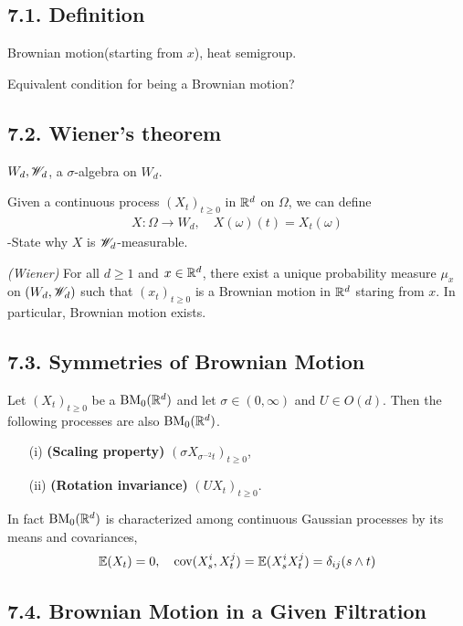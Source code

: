 \documentclass[10pt,a4paper]{report}
\begin{document}
\subsection*{7.1. Definition}

 Brownian motion(starting from $x$), heat semigroup.
\s

Equivalent condition for being a Brownian motion?

\subsection*{7.2. Wiener's theorem}

$W_d, \mathscr{W}_d$, a $\sigma$-algebra on $W_d$.
\s

Given a continuous process $(X_t)_{t\geq 0}$ in $\mathbb{R}^d$ on $\Omega$, we can define 
\begin{align*}
X : \Omega \rightarrow W_d, \quad X(\omega)(t) = X_t(\omega)
\end{align*}
-State why $X$ is $\mathscr{W}_d$-measurable.
\s

\emph{(Wiener)} For all $d\geq 1$ and $x\in \mathbb{R}^d$, there exist a unique probability measure $\mu_x$ on $(W_d, \mathscr{W}_d)$ such that $(x_t)_{t\geq 0}$ is a Brownian motion in $\mathbb{R}^d$ staring from $x$. In particular, Brownian motion exists.

\subsection*{7.3. Symmetries of Brownian Motion}

 Let $(X_t)_{t\geq 0}$ be a $\text{BM}_0(\mathbb{R}^d)$ and let $\sigma \in (0,\infty)$ and $U\in O(d)$. Then the following processes are also $\text{BM}_0(\mathbb{R}^d)$.
\begin{itemize}
\item[(i)] \textbf{(Scaling property)} $(\sigma X_{\sigma^{-2}t})_{t\geq 0}$,
\item[(ii)] \textbf{(Rotation invariance)} $(UX_t)_{t\geq 0}$.
\end{itemize}
In fact $\text{BM}_0(\mathbb{R}^d)$ is characterized among continuous Gaussian processes by its means and covariances,
\begin{align*}
\mathbb{E}(X_t) =0, \quad \text{cov}(X_s^i, X_t^j) = \mathbb{E}(X^i_s X^j_t) = \delta_{ij} (s\wedge t)
\end{align*}

\subsection*{7.4. Brownian Motion in a Given Filtration}
\end{document}
